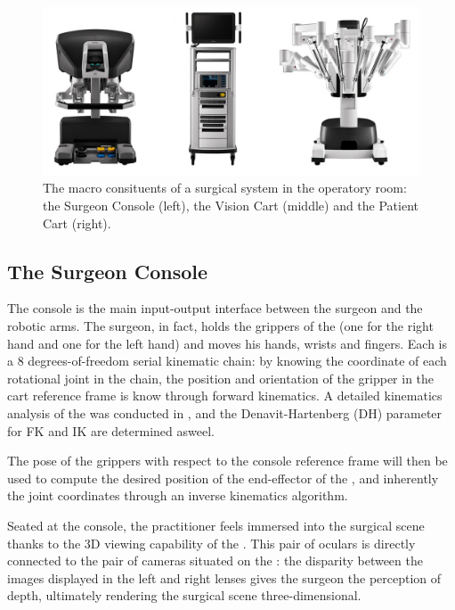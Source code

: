 \documentclass[../main.tex]{subfiles}
\begin{document}
\begin{figure}[h!]
    \centering
    \includegraphics[width=\textwidth]{images/davinci_system.jpg}
    \caption{The macro consituents of a \davinci surgical system in the operatory room: the Surgeon Console (left), the Vision Cart (middle) and the Patient Cart (right).}
    \label{fig:davincisystem}
\end{figure}

\subsection{The Surgeon Console}
The console is the main input-output interface between the surgeon and the robotic arms. The surgeon, in fact, holds the grippers of the \mtms (one for the right hand and one for the left hand) and moves his hands, wrists and fingers. Each \mtm is a 8 degrees-of-freedom serial kinematic chain: by knowing the coordinate of each rotational joint in the chain, the position and orientation of the gripper in the cart reference frame is know through forward kinematics. A detailed kinematics analysis of the \davinci was conducted in \cite{Fontanelli2017}, and the Denavit-Hartenberg (DH) parameter for FK and IK are determined asweel. 

The pose of the \mtms grippers with respect to the console reference frame will then be used to compute the desired position of the end-effector of the \psms, and inherently the joint coordinates through an inverse kinematics algorithm.

Seated at the console, the practitioner feels immersed into the surgical scene thanks to the 3D viewing capability of the \hrsv. This pair of oculars is directly connected to the pair of cameras situated on the \ecm: the disparity between the images displayed in the left and right lenses gives the surgeon the perception of depth, ultimately rendering the surgical scene three-dimensional. 
\end{document}

